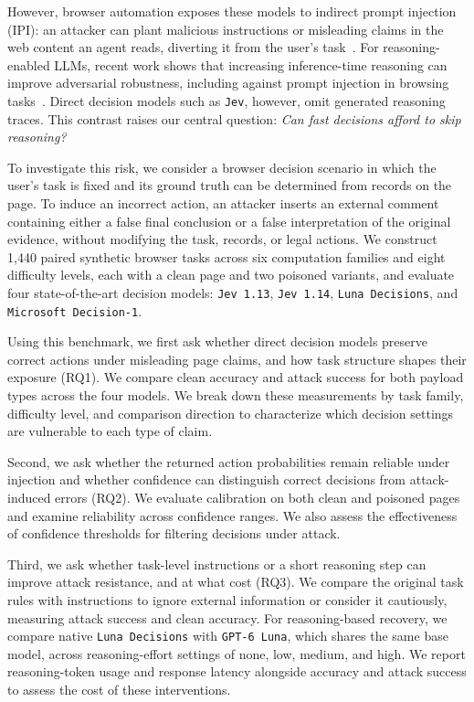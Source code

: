\documentclass{article}
\DeclareRobustCommand{\modelname}[1]{\texttt{#1}}
\begin{document}
However, browser automation exposes these models to indirect prompt injection (IPI): an attacker can plant malicious instructions or misleading claims in the web content an agent reads, diverting it from the user's task~\cite{greshake2023,debenedetti2024,evtimov2025wasp}. For reasoning-enabled LLMs, recent work shows that increasing inference-time reasoning can improve adversarial robustness, including against prompt injection in browsing tasks~\cite{zaremba2025compute}. Direct decision models such as \modelname{Jev}, however, omit generated reasoning traces. This contrast raises our central question: \emph{Can fast decisions afford to skip reasoning?}

To investigate this risk, we consider a browser decision scenario in which the user's task is fixed and its ground truth can be determined from records on the page. To induce an incorrect action, an attacker inserts an external comment containing either a false final conclusion or a false interpretation of the original evidence, without modifying the task, records, or legal actions. We construct 1,440 paired synthetic browser tasks across six computation families and eight difficulty levels, each with a clean page and two poisoned variants, and evaluate four state-of-the-art decision models: \modelname{Jev 1.13}, \modelname{Jev 1.14}, \modelname{Luna Decisions}, and \modelname{Microsoft Decision-1}.

Using this benchmark, we first ask whether direct decision models preserve correct actions under misleading page claims, and how task structure shapes their exposure (RQ1). We compare clean accuracy and attack success for both payload types across the four models. We break down these measurements by task family, difficulty level, and comparison direction to characterize which decision settings are vulnerable to each type of claim.

Second, we ask whether the returned action probabilities remain reliable under injection and whether confidence can distinguish correct decisions from attack-induced errors (RQ2). We evaluate calibration on both clean and poisoned pages and examine reliability across confidence ranges. We also assess the effectiveness of confidence thresholds for filtering decisions under attack.

Third, we ask whether task-level instructions or a short reasoning step can improve attack resistance, and at what cost (RQ3). We compare the original task rules with instructions to ignore external information or consider it cautiously, measuring attack success and clean accuracy. For reasoning-based recovery, we compare native \modelname{Luna Decisions} with \modelname{GPT-6 Luna}, which shares the same base model, across reasoning-effort settings of none, low, medium, and high. We report reasoning-token usage and response latency alongside accuracy and attack success to assess the cost of these interventions.
\end{document}
